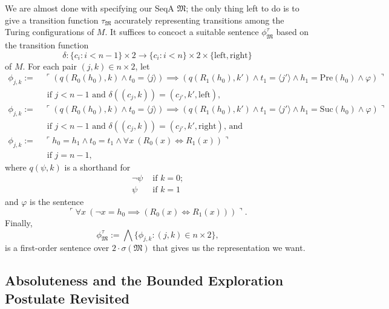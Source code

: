 \documentclass[12pt]{article}
\numberwithin{equation}{section}
\begin{document}
\begin{ex}
We are almost done with specifying our SeqA $\mathfrak{M}$; the only thing left to do is to give a transition function $\tau_{\mathfrak{M}}$ accurately representing transitions among the Turing configurations of $M$. It suffices to concoct a suitable sentence $\phi^{\tau}_{\mathfrak{M}}$ based on the transition function $$\delta : \{c_i : i < n-1\} \times 2 \longrightarrow \{c_i : i < n\} \times 2 \times \{\mathrm{left}, \mathrm{right}\}$$ of $M$. For each pair $(j, k) \in n \times 2$, let
\begin{align*}
    \phi_{j,k} := \ & \ulcorner (q(R_0(h_0), k) \wedge t_0 \! = \! \langle j \rangle) \!\! \implies \!\! (q(R_1(h_0), k') \wedge t_1 \! = \! \langle j' \rangle \wedge h_1 \! = \mathrm{Pre}(h_0) \wedge \varphi) \urcorner \\ 
    & \text{ if } j < n-1 \text{ and } \delta((c_j, k)) = (c_{j'}, k', \mathrm{left}) \text{,} \\
    \phi_{j,k} := \ & \ulcorner (q(R_0(h_0), k) \wedge t_0 \! = \! \langle j \rangle) \!\! \implies \!\! (q(R_1(h_0), k') \wedge t_1 \! = \! \langle j' \rangle \wedge h_1 \! = \mathrm{Suc}(h_0) \wedge \varphi) \urcorner \\ 
    & \text{ if } j < n-1 \text{ and } \delta((c_j, k)) = (c_{j'}, k', \mathrm{right}) \text{, and} \\
    \phi_{j,k} := \ & \ulcorner h_0 = h_1 \wedge t_0 = t_1 \wedge \forall x \ (R_0(x) \iff R_1(x)) \urcorner \\ 
    & \text{ if } j = n-1 \text{,}
\end{align*}
where $q(\psi, k)$ is a shorthand for 
\begin{align*}
    \neg \psi & \text{ if } k = 0 \text{;} \\
    \psi & \text{ if } k = 1
\end{align*}
and $\varphi$ is the sentence
\begin{equation*}
    \ulcorner \forall x \ (\neg x = h_0 \implies (R_0(x) \iff R_1(x))) \urcorner \text{.}
\end{equation*}
Finally, 
\begin{equation*}
    \phi^{\tau}_{\mathfrak{M}} := \bigwedge \{\phi_{j,k} : (j, k) \in n \times 2\} \text{,}
\end{equation*}
is a first-order sentence over $2 \cdot \sigma(\mathfrak{M})$ that gives us the representation we want.
\end{ex}

\subsection{Absoluteness and the Bounded Exploration Postulate Revisited}
\end{document}
